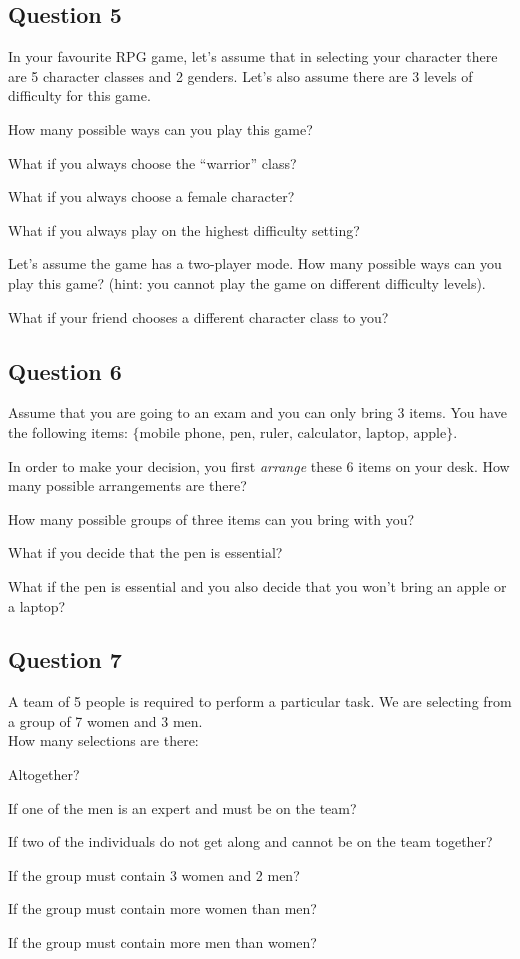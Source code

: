 \subsection*{Question 5}
In your favourite RPG game, let's assume that in selecting your character there are 5 character classes and 2 genders. Let's also assume there are 3 levels of difficulty for this game.\\[-0.2cm]

\item How many possible ways can you play this game? \quad \item What if you always choose the ``warrior'' class? \quad \item What if you always choose a female character? \quad \item What if you always play on the highest difficulty setting? \quad \item Let's assume the game has a two-player mode. How many possible ways can you play this game? (hint: you cannot play the game on different difficulty levels). \item What if your friend chooses a different character class to you?


\subsection*{Question 6}
Assume that you are going to an exam and you can only bring 3 items. You have the following items: $\{\text{mobile phone, } \text{pen, } \text{ruler, } \text{calculator, } \text{laptop, } \text{apple} \}$.

\item In order to make your decision, you first \emph{arrange} these 6 items on your desk. How many possible arrangements are there? \quad \item How many possible groups of three items can you bring with you? \quad \item What if you decide that the pen is essential? \quad \item What if the pen is essential and you also decide that you won't bring an apple or a laptop?


\subsection*{Question 7}
A team of 5 people is required to perform a particular task. We are selecting from a group of 7 women and 3 men.\\[0.2cm]
How many selections are there:

\item Altogether? \quad \item If one of the men is an expert and must be on the team? \quad \item If two of the individuals do not get along and cannot be on the team together? \quad \item If the group must contain 3 women and 2 men? \item If the group must contain more women than men? \quad \item If the group must contain more men than women?




